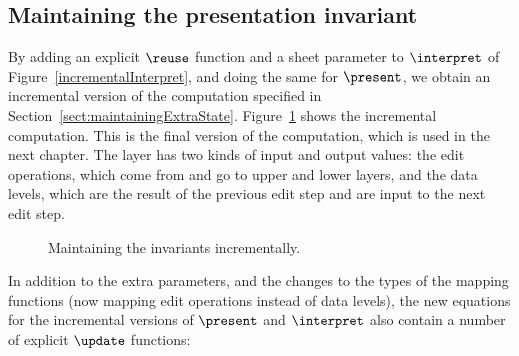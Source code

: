 %																
\subsection{Maintaining the presentation invariant} \label{sect:incrementalSpec}

By adding an explicit $\reuse$ function and a sheet parameter to $\interpret$ of Figure~\ref{incrementalInterpret}, and doing the same for $\present$, we obtain an incremental version of the computation specified in Section~\ref{sect:maintainingExtraState}. Figure~\ref{layerExtraStateInc} shows the incremental computation. This is the final version of the computation, which is used in the next chapter. The layer has two kinds of input and output values: the edit operations, which come from and go to upper and lower layers, and the data levels, which are the result of the previous edit step and are input to the next edit step.

\begin{figure}
\begin{center}
\begin{center}
\end{center}
\caption{Maintaining the invariants incrementally.}\label{layerExtraStateInc} 
\end{center}
\end{figure}

In addition to the extra parameters, and the changes to the types of the mapping functions (now mapping edit operations instead of data levels),  the new equations for the incremental versions of $\present$ and 
$\interpret$ also contain a number of explicit  $\update$ functions: 

